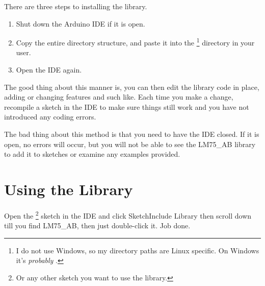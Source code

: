There are three steps to installing the library.

\begin{enumerate}
    \item Shut down the Arduino IDE if it is open.
    \item Copy the entire  directory structure, and paste it into the \footnote{I do not use Windows, so my directory paths are Linux specific. On Windows it's \emph{probably} .} directory in your user.
    \item Open the IDE again.
\end{enumerate}

The good thing about this manner is, you can then edit the library code in place, adding or changing features and such like. Each time you make a change, recompile a sketch in the IDE to make sure things still work and you have not introduced any coding errors.

The bad thing about this method is that you need to have the IDE closed. If it is open, no errors will occur, but you will not be able to see the LM75\_AB library to add it to sketches or examine any examples provided.

\section{Using the Library}\label{section: Using the library}

Open the \footnote{Or any other sketch you want to use the library.} sketch in the IDE and click Sketch\lyxarrow{}Include Library then scroll down till you find LM75\_AB, then just double-click it. Job done.